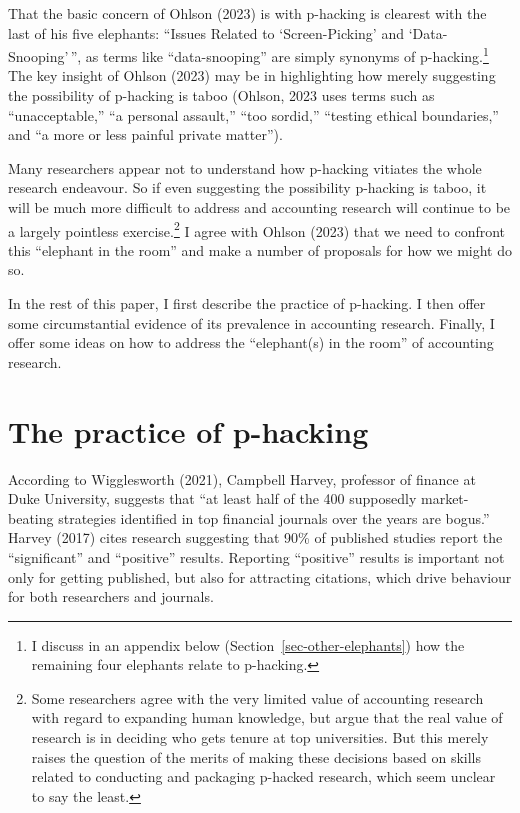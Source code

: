 \documentclass[
  letterpaper,
  DIV=11,
  numbers=noendperiod]{scrartcl}
\begin{document}
That the basic concern of Ohlson (2023) is with p-hacking is clearest
with the last of his five elephants: ``Issues Related to
`Screen-Picking' and `Data-Snooping'\,'', as terms like
``data-snooping'' are simply synonyms of p-hacking.\footnote{I discuss
  in an appendix below (Section~\ref{sec-other-elephants}) how the
  remaining four elephants relate to p-hacking.} The key insight of
Ohlson (2023) may be in highlighting how merely suggesting the
possibility of p-hacking is taboo (Ohlson, 2023 uses terms such as
``unacceptable,'' ``a personal assault,'' ``too sordid,'' ``testing
ethical boundaries,'' and ``a more or less painful private matter'').

Many researchers appear not to understand how p-hacking vitiates the
whole research endeavour. So if even suggesting the possibility
p-hacking is taboo, it will be much more difficult to address and
accounting research will continue to be a largely pointless
exercise.\footnote{Some researchers agree with the very limited value of
  accounting research with regard to expanding human knowledge, but
  argue that the real value of research is in deciding who gets tenure
  at top universities. But this merely raises the question of the merits
  of making these decisions based on skills related to conducting and
  packaging p-hacked research, which seem unclear to say the least.} I
agree with Ohlson (2023) that we need to confront this ``elephant in the
room'' and make a number of proposals for how we might do so.

In the rest of this paper, I first describe the practice of p-hacking. I
then offer some circumstantial evidence of its prevalence in accounting
research. Finally, I offer some ideas on how to address the
``elephant(s) in the room'' of accounting research.

\hypertarget{the-practice-of-p-hacking}{%
\section{The practice of p-hacking}\label{the-practice-of-p-hacking}}

According to Wigglesworth (2021), Campbell Harvey, professor of finance
at Duke University, suggests that ``at least half of the 400 supposedly
market-beating strategies identified in top financial journals over the
years are bogus.'' Harvey (2017) cites research suggesting that 90\% of
published studies report the ``significant'' and ``positive'' results.
Reporting ``positive'' results is important not only for getting
published, but also for attracting citations, which drive behaviour for
both researchers and journals.
\end{document}
